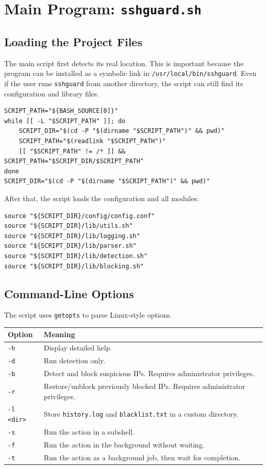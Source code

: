 \documentclass[12pt,a4paper]{article}
\begin{document}
\section{Main Program: \texttt{sshguard.sh}}

\subsection{Loading the Project Files}

The main script first detects its real location. This is important because the program can
be installed as a symbolic link in \texttt{/usr/local/bin/sshguard}. Even if the user runs
\texttt{sshguard} from another directory, the script can still find its configuration and
library files.

\begin{lstlisting}[style=bashstyle]
SCRIPT_PATH="${BASH_SOURCE[0]}"
while [[ -L "$SCRIPT_PATH" ]]; do
    SCRIPT_DIR="$(cd -P "$(dirname "$SCRIPT_PATH")" && pwd)"
    SCRIPT_PATH="$(readlink "$SCRIPT_PATH")"
    [[ "$SCRIPT_PATH" != /* ]] && SCRIPT_PATH="$SCRIPT_DIR/$SCRIPT_PATH"
done
SCRIPT_DIR="$(cd -P "$(dirname "$SCRIPT_PATH")" && pwd)"
\end{lstlisting}

After that, the script loads the configuration and all modules:

\begin{lstlisting}[style=bashstyle]
source "${SCRIPT_DIR}/config/config.conf"
source "${SCRIPT_DIR}/lib/utils.sh"
source "${SCRIPT_DIR}/lib/logging.sh"
source "${SCRIPT_DIR}/lib/parser.sh"
source "${SCRIPT_DIR}/lib/detection.sh"
source "${SCRIPT_DIR}/lib/blocking.sh"
\end{lstlisting}

\subsection{Command-Line Options}

The script uses \texttt{getopts} to parse Linux-style options.

\begin{longtable}{|p{2cm}|p{11cm}|}
\hline
\textbf{Option} & \textbf{Meaning} \\
\hline
\texttt{-h} & Display detailed help. \\
\hline
\texttt{-d} & Run detection only. \\
\hline
\texttt{-b} & Detect and block suspicious IPs. Requires administrator privileges. \\
\hline
\texttt{-r} & Restore/unblock previously blocked IPs. Requires administrator privileges. \\
\hline
\texttt{-l <dir>} & Store \texttt{history.log} and \texttt{blacklist.txt} in a custom directory. \\
\hline
\texttt{-s} & Run the action in a subshell. \\
\hline
\texttt{-f} & Run the action in the background without waiting. \\
\hline
\texttt{-t} & Run the action as a background job, then wait for completion. \\
\hline
\end{longtable}
\end{document}

